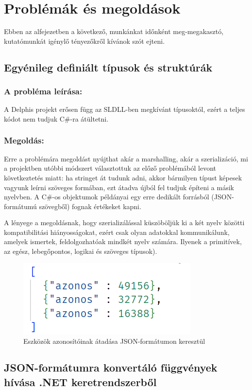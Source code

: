 \documentclass[tocnopagenum]{thesis-ekf}
\theoremstyle{definition}
\theoremstyle{remark}
\begin{document}
	\section{Problémák és megoldások}
	Ebben az alfejezetben a következő, munkánkat időnként meg-megakasztó, kutatómunkát igénylő tényezőkről kívánok szót ejteni.
	\subsection{Egyénileg definiált típusok és struktúrák}
	\subsubsection{A probléma leírása:} A Delphis projekt erősen függ az SLDLL-ben megkívánt típusoktól, ezért a teljes kódot nem tudjuk C\#-ra átültetni.
	\subsubsection{Megoldás:} 
	Erre a problémára megoldást nyújthat akár a marshalling, akár a szerializáció, mi a projektben utóbbi módszert választottuk az előző problémából levont következtetés miatt: ha stringet át tudunk adni, akkor bármilyen típust képesek vagyunk leírni szöveges formában, ezt átadva újból fel tudjuk építeni a másik nyelvben. A C\#-os objektumok példányai egy erre dedikált forrásból (JSON-formátumú szövegből) fognak értékeket kapni.
	
	A lényege a megoldásnak, hogy szerializálással küszöböljük ki a két nyelv közötti kompatibilitási hiányosságokat, ezért csak olyan adatokkal kommunikálunk, amelyek ismertek, feldolgozhatóak mindkét nyelv számára. Ilyenek a primitívek, az egész, lebegőpontos, logikai és szöveges típusok).
	\begin{figure}[h!]
		\centering
		\includegraphics[scale=0.89]{json_szerializalas_azonositok}
		\caption{Eszközök azonosítóinak átadása JSON-formátumon keresztül}
		\label{json_azonositok}
	\end{figure}
	\subsection{JSON-formátumra konvertáló függvények hívása .NET keretrendszerből}
\end{document}
